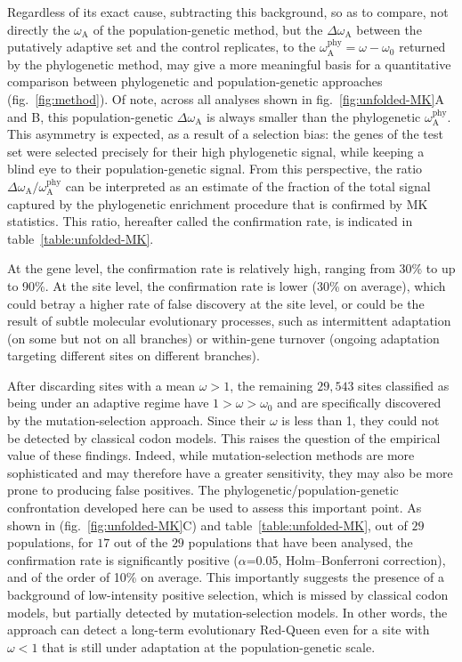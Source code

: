 \documentclass[9pt,twocolumn,twoside,lineno]{pnas-new}
\newcommand{\rateApop}{\omega_{\mathrm{A}}}
\newcommand{\rateAphy}{\rateApop^{\mathrm{phy}}}
\begin{document}
Regardless of its exact cause, subtracting this background, so as to compare, not directly the $\rateApop$ of the population-genetic method, but the $\Delta \rateApop$ between the putatively adaptive set and the control replicates, to the $\rateAphy= \omega - \omega_0$ returned by the phylogenetic method, may give a more meaningful basis for a quantitative comparison between phylogenetic and population-genetic approaches (fig.~\ref{fig:method}).
Of note, across all analyses shown in fig.~\ref{fig:unfolded-MK}A and B, this population-genetic $\Delta \rateApop$ is always smaller than the phylogenetic $\rateAphy$.
This asymmetry is expected, as a result of a selection bias: the genes of the test set were selected precisely for their high phylogenetic signal, while keeping a blind eye to their population-genetic signal.
From this perspective, the ratio $\Delta \rateApop /  \rateAphy$ can be interpreted as an estimate of the fraction of the total signal captured by the phylogenetic enrichment procedure that is confirmed by MK statistics.
This ratio, hereafter called the confirmation rate, is indicated in table~\ref{table:unfolded-MK}.

At the gene level, the confirmation rate is relatively high, ranging from 30\% to up to 90\%.
At the site level, the confirmation rate is lower (30\% on average), which could betray a higher rate of false discovery at the site level, or could be the result of subtle molecular evolutionary processes, such as intermittent adaptation (on some but not on all branches) or within-gene turnover (ongoing adaptation targeting different sites on different branches).

After discarding sites with a mean $\omega > 1$, the remaining $29,543$ sites classified as being under an adaptive regime have $1 > \omega > \omega_{0}$ and are specifically discovered by the mutation-selection approach.
Since their $\omega$ is less than 1, they could not be detected by classical codon models.
This raises the question of the empirical value of these findings.
Indeed, while mutation-selection methods are more sophisticated and may therefore have a greater sensitivity, they may also be more prone to producing false positives.
The phylogenetic/population-genetic confrontation developed here can be used to assess this important point.
As shown in (fig.~\ref{fig:unfolded-MK}C) and table~\ref{table:unfolded-MK}, out of $29$ populations, for $17$ out of the $29$ populations that have been analysed, the confirmation rate is significantly positive ($\alpha$=0.05, Holm–Bonferroni correction), and of the order of 10\% on average.
This importantly suggests the presence of a background of low-intensity positive selection, which is missed by classical codon models, but partially detected by mutation-selection models.
In other words, the approach can detect a long-term evolutionary Red-Queen even for a site with $\omega < 1$ that is still under adaptation at the population-genetic scale.
\end{document}
